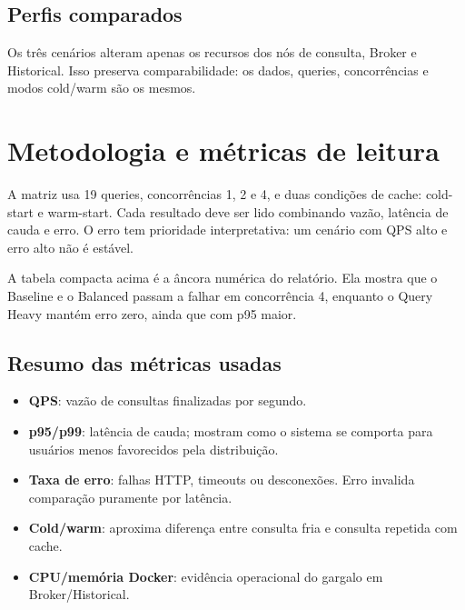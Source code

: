 \documentclass[11pt,a4paper]{article}
\begin{document}
\subsection{Perfis comparados}



Os três cenários alteram apenas os recursos dos nós de consulta, Broker e Historical. Isso preserva comparabilidade: os dados, queries, concorrências e modos cold/warm são os mesmos.

\clearpage

\section{Metodologia e métricas de leitura}

A matriz usa 19 queries, concorrências 1, 2 e 4, e duas condições de cache: cold-start e warm-start. Cada resultado deve ser lido combinando vazão, latência de cauda e erro. O erro tem prioridade interpretativa: um cenário com QPS alto e erro alto não é estável.



A tabela compacta acima é a âncora numérica do relatório. Ela mostra que o Baseline e o Balanced passam a falhar em concorrência 4, enquanto o Query Heavy mantém erro zero, ainda que com p95 maior.

\subsection{Resumo das métricas usadas}

\begin{itemize}

\item \textbf{QPS}: vazão de consultas finalizadas por segundo.

\item \textbf{p95/p99}: latência de cauda; mostram como o sistema se comporta para usuários menos favorecidos pela distribuição.

\item \textbf{Taxa de erro}: falhas HTTP, timeouts ou desconexões. Erro invalida comparação puramente por latência.

\item \textbf{Cold/warm}: aproxima diferença entre consulta fria e consulta repetida com cache.

\item \textbf{CPU/memória Docker}: evidência operacional do gargalo em Broker/Historical.

\end{itemize}
\end{document}
